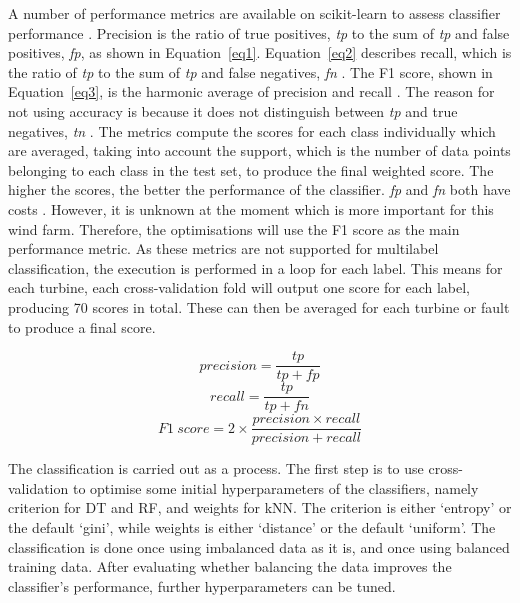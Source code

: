 A number of performance metrics are available on scikit-learn to assess classifier performance \cite{33M}. Precision is the ratio of true positives, \textit{tp} to the sum of \textit{tp} and false positives, \textit{fp}, as shown in Equation~\ref{eq1}. Equation~\ref{eq2} describes recall, which is the ratio of \textit{tp} to the sum of \textit{tp} and false negatives, \textit{fn} \cite{deRu15}. The F1 score, shown in Equation~\ref{eq3}, is the harmonic average of precision and recall \cite{Perfo}. The reason for not using accuracy is because it does not distinguish between \textit{tp} and true negatives, \textit{tn} \cite{Perfo,SASH}. The metrics compute the scores for each class individually which are averaged, taking into account the support, which is the number of data points belonging to each class in the test set, to produce the final weighted score. The higher the scores, the better the performance of the classifier. \textit{fp} and \textit{fn} both have costs \cite{Perfo}. However, it is unknown at the moment which is more important for this wind farm. Therefore, the optimisations will use the F1 score as the main performance metric. As these metrics are not supported for multilabel classification, the execution is performed in a loop for each label. This means for each turbine, each cross-validation fold will output one score for each label, producing 70 scores in total. These can then be averaged for each turbine or fault to produce a final score.

\begin{equation}\label{eq1}
    precision = \frac{tp}{tp + fp}
\end{equation}
\begin{equation}\label{eq2}
    recall = \frac{tp}{tp + fn}
\end{equation}
\begin{equation}\label{eq3}
    F1~score = 2 \times \frac{precision \times recall}{precision + recall}
\end{equation}

The classification is carried out as a process. The first step is to use cross-validation to optimise some initial hyperparameters of the classifiers, namely criterion for DT and RF, and weights for kNN. The criterion is either `entropy' or the default `gini', while weights is either `distance' or the default `uniform'. The classification is done once using imbalanced data as it is, and once using balanced training data. After evaluating whether balancing the data improves the classifier's performance, further hyperparameters can be tuned.
